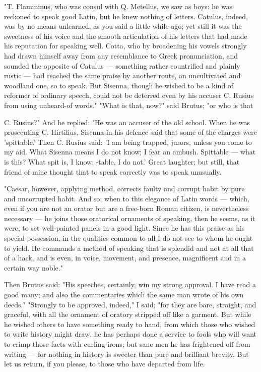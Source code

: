  "T. Flamininus, who was consul with Q. Metellus, we saw as boys: he was reckoned to speak good Latin, but he knew nothing of letters. Catulus, indeed, was by no means unlearned, as you said a little while ago; yet still it was the sweetness of his voice and the smooth articulation of his letters that had made his reputation for speaking well. Cotta, who by broadening his vowels strongly had drawn himself away from any resemblance to Greek pronunciation, and sounded the opposite of Catulus — something rather countrified and plainly rustic — had reached the same praise by another route, an uncultivated and woodland one, so to speak. But Sisenna, though he wished to be a kind of reformer of ordinary speech, could not be deterred even by his accuser C. Rusius from using unheard-of words." "What is that, now?" said Brutus; "or who is that

 C. Rusius?" And he replied: "He was an accuser of the old school. When he was prosecuting C. Hirtilius, Sisenna in his defence said that some of the charges were 'spittable.' Then C. Rusius said: 'I am being trapped, jurors, unless you come to my aid. What Sisenna means I do not know; I fear an ambush. Spittable — what is this? What spit is, I know; -table, I do not.' Great laughter; but still, that friend of mine thought that to speak correctly was to speak unusually.

 "Caesar, however, applying method, corrects faulty and corrupt habit by pure and uncorrupted habit. And so, when to this elegance of Latin words — which, even if you are not an orator but are a free-born Roman citizen, is nevertheless necessary — he joins those oratorical ornaments of speaking, then he seems, as it were, to set well-painted panels in a good light. Since he has this praise as his special possession, in the qualities common to all I do not see to whom he ought to yield. He commands a method of speaking that is splendid and not at all that of a hack, and is even, in voice, movement, and presence, magnificent and in a certain way noble."

 Then Brutus said: "His speeches, certainly, win my strong approval. I have read a good many; and also the commentaries which the same man wrote of his own deeds." "Strongly to be approved, indeed," I said; "for they are bare, straight, and graceful, with all the ornament of oratory stripped off like a garment. But while he wished others to have something ready to hand, from which those who wished to write history might draw, he has perhaps done a service to fools who will want to crimp those facts with curling-irons; but sane men he has frightened off from writing — for nothing in history is sweeter than pure and brilliant brevity. But let us return, if you please, to those who have departed from life.

